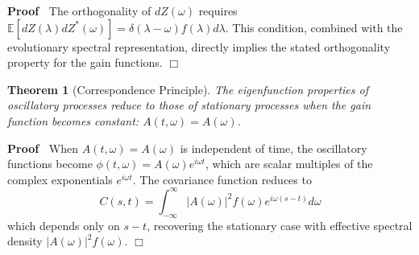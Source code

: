 \documentclass{article}
\newenvironment{proof}{\noindent\textbf{Proof\ }}{\hspace*{\fill}$\Box$\medskip}
\newtheorem{theorem}{Theorem}
\begin{document}
\begin{proof}
  The orthogonality of $dZ (\omega)$ requires $\mathbb{E} [dZ (\lambda)
  dZ^{\ast} (\omega)] = \delta (\lambda - \omega) f (\lambda) d \lambda$. This
  condition, combined with the evolutionary spectral representation, directly
  implies the stated orthogonality property for the gain functions.
\end{proof}

\begin{theorem}
  [Correspondence Principle] The eigenfunction properties of oscillatory
  processes reduce to those of stationary processes when the gain function
  becomes constant: $A (t, \omega) = A (\omega)$.
\end{theorem}

\begin{proof}
  When $A (t, \omega) = A (\omega)$ is independent of time, the oscillatory
  functions become $\phi (t, \omega) = A (\omega) e^{i \omega t}$, which are
  scalar multiples of the complex exponentials $e^{i \omega t}$. The
  covariance function reduces to
  \begin{equation}
    C (s, t) = \int_{- \infty}^{\infty} |A (\omega) |^2 f (\omega) e^{i \omega
    (s - t)} d \omega
  \end{equation}
  which depends only on $s - t$, recovering the stationary case with effective
  spectral density $|A (\omega) |^2 f (\omega)$.
\end{proof}
\end{document}
